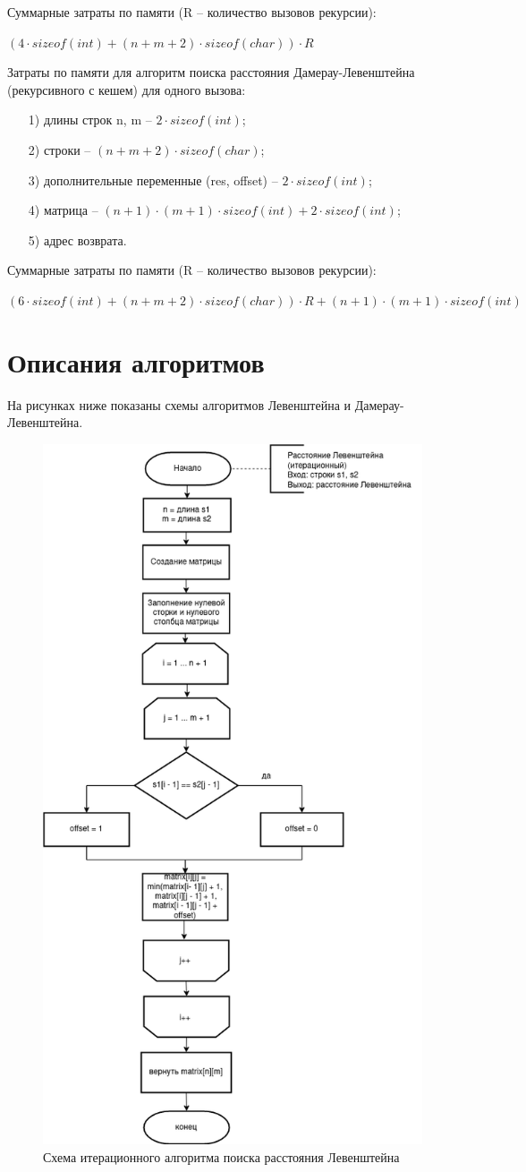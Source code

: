 \documentclass[12pt]{report}
\begin{document}
	Суммарные затраты по памяти (R -- количество вызовов рекурсии):
	
	$(4 \cdot sizeof(int) + (n + m + 2) \cdot sizeof(char)) \cdot R$\newline
	
	Затраты по памяти для алгоритм поиска расстояния Дамерау-Левенштейна (рекурсивного с кешем) для одного вызова:
	
	\begin{enumerate}
	\item[1)] длины строк n, m -- $2 \cdot sizeof(int)$;
	\item[2)] строки -- $(n + m + 2) \cdot sizeof(char)$;
	\item[3)] дополнительные переменные (res, offset) -- $2 \cdot sizeof(int)$; 
	\item[4)] матрица -- $(n + 1) \cdot (m + 1) \cdot sizeof(int) + 2 \cdot sizeof(int)$;
	\item[5)] адрес возврата.
	\end{enumerate}
	
	Суммарные затраты по памяти (R -- количество вызовов рекурсии):
	
	$(6 \cdot sizeof(int) + (n + m + 2) \cdot sizeof(char)) \cdot R + (n + 1) \cdot (m + 1) \cdot sizeof(int)$\newline
	
	\section{Описания алгоритмов}
	
	На рисунках ниже показаны схемы алгоритмов Левенштейна и Дамерау-Левенштейна.
	
	\begin{figure}[H]
		\centering
		\includegraphics[width=0.6\linewidth]{Lev}
		\caption{Схема итерационного алгоритма поиска расстояния Левенштейна}
		\label{fig:schema_bucket_1}
	\end{figure}
	
\end{document}
